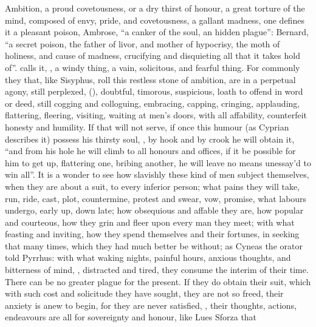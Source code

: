 Ambition, a proud covetousness, or a dry thirst of honour, a great torture of
the mind, composed of envy, pride, and covetousness, a gallant madness, one
defines it a pleasant poison, Ambrose, \enquote{a canker of the
soul, an hidden plague}: Bernard, \enquote{a secret poison, the
father of livor, and mother of hypocrisy, the moth of holiness, and cause of
madness, crucifying and disquieting all that it takes hold of}.
\Seneca{} calls it, , a windy thing, a vain, solicitous, and fearful thing. For commonly
they that, like Sisyphus, roll this restless stone of ambition, are in a
perpetual agony, still perplexed,  (\Lucretius{}), doubtful, timorous, suspicious, loath to
offend in word or deed, still cogging and colloguing, embracing, capping,
cringing, applauding, flattering, fleering, visiting, waiting at men's doors,
with all affability, counterfeit honesty and humility. If
that will not serve, if once this humour (as Cyprian
describes it) possess his thirsty soul, , by hook and by crook he will obtain it, \enquote{and from his hole he
will climb to all honours and offices, if it be possible for him to get up,
flattering one, bribing another, he will leave no means unessay'd to win all}.
It is a wonder to see how slavishly these kind of men
subject themselves, when they are about a suit, to every inferior person; what
pains they will take, run, ride, cast, plot, countermine, protest and swear,
vow, promise, what labours undergo, early up, down late; how obsequious and
affable they are, how popular and courteous, how they grin and fleer upon every
man they meet; with what feasting and inviting, how they spend themselves and
their fortunes, in seeking that many times, which they had much better be
without; as Cyneas the orator told Pyrrhus: with what
waking nights, painful hours, anxious thoughts, and bitterness of mind,
, distracted and tired, they consume the interim of
their time. There can be no greater plague for the present. If they do obtain
their suit, which with such cost and solicitude they have sought, they are not
so freed, their anxiety is anew to begin, for they are never satisfied,
, their thoughts, actions, endeavours are
all for sovereignty and honour, like Lues Sforza that
